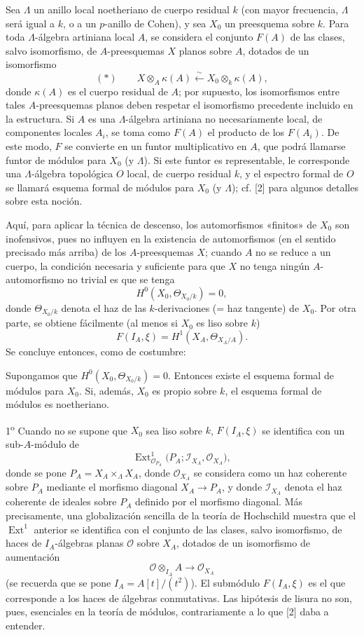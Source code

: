 Sea $\Lambda$ un anillo local noetheriano de cuerpo residual $k$ (con mayor
frecuencia, $\Lambda$ será igual a $k$, o a un $p$-anillo de Cohen), y sea
$X_0$ un preesquema sobre $k$. Para toda $\Lambda$-álgebra artiniana local $A$,
se considera el conjunto $F(A)$ de las clases, salvo isomorfismo, de
$A$-preesquemas $X$ planos sobre $A$, dotados de un isomorfismo
\[
  (*)\qquad
  X\otimes_A\kappa(A)\xleftarrow{\sim}
  X_0\otimes_k\kappa(A),
\]
donde $\kappa(A)$ es el cuerpo residual de $A$; por supuesto, los isomorfismos
entre tales $A$-preesquemas planos deben respetar el isomorfismo precedente
incluido en la estructura. Si $A$ es una $\Lambda$-álgebra artiniana no
necesariamente local, de componentes locales $A_i$, se toma como $F(A)$ el
producto de los $F(A_i)$. De este modo, $F$ se convierte en un funtor
multiplicativo en $A$, que podrá llamarse funtor de módulos para $X_0$ (y
$\Lambda$). Si este funtor es representable, le corresponde una
$\Lambda$-álgebra topológica $O$ local, de cuerpo residual $k$, y el espectro
formal de $O$ se llamará esquema formal de módulos para $X_0$ (y $\Lambda$);
cf. [2] para algunos detalles sobre esta noción.

Aquí, para aplicar la técnica de descenso, los automorfismos «finitos» de $X_0$
son inofensivos, pues no influyen en la existencia de automorfismos (en el
sentido precisado más arriba) de los $A$-preesquemas $X$; cuando $A$ no se
reduce a un cuerpo, la condición necesaria y suficiente para que $X$ no tenga
ningún $A$-automorfismo no trivial es que se tenga
\[
  H^0(X_0,\Theta_{X_0/k})=0,
\]
donde $\Theta_{X_0/k}$ denota el haz de las $k$-derivaciones (= haz tangente)
de $X_0$. Por otra parte, se obtiene fácilmente (al menos si $X_0$ es liso
sobre $k$)
\[
  F(I_A,\xi)=H^1(X_A,\Theta_{X_A/A}).
\]
Se concluye entonces, como de costumbre:

 Supongamos que
$H^0(X_0,\Theta_{X_0/k})=0$. Entonces existe el esquema formal de módulos para
$X_0$. Si, además, $X_0$ es propio sobre $k$, el esquema formal de módulos es
noetheriano.

 1\textsuperscript{o} Cuando no se supone que $X_0$ sea
liso sobre $k$, $F(I_A,\xi)$ se identifica con un sub-$A$-módulo de
\[
  \operatorname{Ext}^1_{\mathcal O_{P_A}}
  \bigl(P_A;\mathcal I_{X_A},\mathcal O_{X_A}\bigr),
\]
donde se pone $P_A=X_A\times_\Lambda X_A$, donde $\mathcal O_{X_A}$ se
considera como un haz coherente sobre $P_A$ mediante el morfismo diagonal
$X_A\longrightarrow P_A$, y donde $\mathcal I_{X_A}$ denota el haz coherente
de ideales sobre $P_A$ definido por el morfismo diagonal. Más precisamente,
una globalización sencilla de la teoría de Hochschild muestra que el
$\operatorname{Ext}^1$ anterior se identifica con el conjunto de las clases,
salvo isomorfismo, de haces de $I_A$-álgebras planas $\mathcal O$ sobre $X_A$,
dotados de un isomorfismo de aumentación
\[
  \mathcal O\otimes_{I_A}A\longrightarrow\mathcal O_{X_A}
\]
(se recuerda que se pone $I_A=A[t]/(t^2)$). El submódulo $F(I_A,\xi)$ es el
que corresponde a los haces de álgebras conmutativas. Las hipótesis de lisura
no son, pues, esenciales en la teoría de módulos, contrariamente a lo que [2]
daba a entender.

